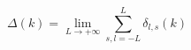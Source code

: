 \begin{equation}
\Delta(k)=\lim_{L\rightarrow+\infty}\sum_{s,l=-L}^{L}\delta_{l,s}(k)
\end{equation}

